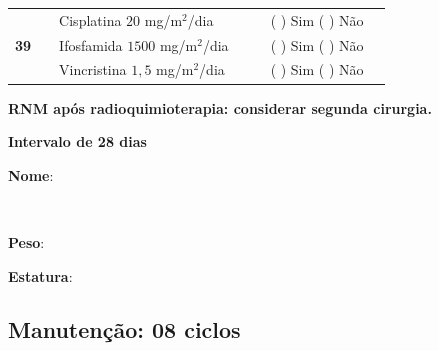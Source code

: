 \documentclass[11pt,a4paper,oldfontcommands]{memoir}
\def\entrywithlabel[#1]#2{\parbox{#1}{{\small #2:} \hrulefill}}
\begin{document}
\begin{center}
\begin{table}[H]
\begin{tabular}{p{1cm}c|p{4cm}|p{2cm}p{2cm}|c|c}
    \cline{2-3}\cline{6-6}
    \multicolumn{1}{c|}{\multirow{3}{*}{\textbf{39}}}&\multirow{3}{*}{}&{Cisplatina \(20\) mg/m\(^2\)/dia}&{}&&{(  ) Sim (  ) Não}&\\
    \multicolumn{1}{c|}{}&&{Ifosfamida \(1500\) mg/m\(^2\)/dia}&&&{(  ) Sim (  ) Não}&\\
    \multicolumn{1}{c|}{}&&{Vincristina \(1,5\) mg/m\(^2\)/dia}&&&{(  ) Sim (  ) Não}&\\
    \hline
\end{tabular}
\end{table}
\textbf{RNM após radioquimioterapia: considerar segunda cirurgia.}

\textbf{Intervalo de 28 dias}
\end{center}
\pagebreak

\pagebreak
    \noindent
\entrywithlabel[1\hsize]{\textbf{Nome}}\hfill
\\[0.3cm]
\entrywithlabel[.45\hsize]{\textbf{Peso}}\hfill  \entrywithlabel[.45\hsize]{\textbf{Estatura}}

\subsection{Manutenção: 08 ciclos}
\end{document}
